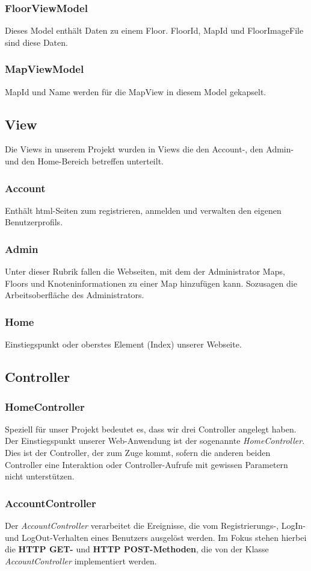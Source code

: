 \subsubsection*{FloorViewModel}
Dieses Model enthält Daten zu einem Floor. FloorId, MapId und FloorImageFile sind diese Daten.
\subsubsection*{MapViewModel}
MapId und Name werden für die MapView in diesem Model gekapselt.

\subsection{View}
Die Views in unserem Projekt wurden in Views die den Account-, den Admin- und den Home-Bereich betreffen unterteilt.
\subsubsection*{Account}
Enthält html-Seiten zum registrieren, anmelden und verwalten den eigenen Benutzerprofils.
\subsubsection*{Admin}
Unter dieser Rubrik fallen die Webseiten, mit dem der Administrator Maps, Floors und Knoteninformationen zu einer Map hinzufügen kann. Sozusagen die Arbeitsoberfläche des Administrators.
\subsubsection*{Home}
Einstiegspunkt oder oberstes Element (Index) unserer Webseite.

\subsection{Controller}
\subsubsection*{HomeController}
Speziell für unser Projekt bedeutet es, dass wir drei Controller angelegt haben. Der Einstiegspunkt unserer Web-Anwendung ist der sogenannte \textit{HomeController}. Dies ist der Controller, der zum Zuge kommt, sofern die anderen beiden Controller eine Interaktion oder Controller-Aufrufe mit gewissen Parametern nicht unterstützen.
\subsubsection*{AccountController}
Der \textit{AccountController} verarbeitet die Ereignisse, die vom Registrierungs-, LogIn- und LogOut-Verhalten eines Benutzers ausgelöst werden. Im Fokus stehen hierbei die \textbf{HTTP GET-} und \textbf{HTTP POST-Methoden}, die von der Klasse \textit{AccountController} implementiert werden.
